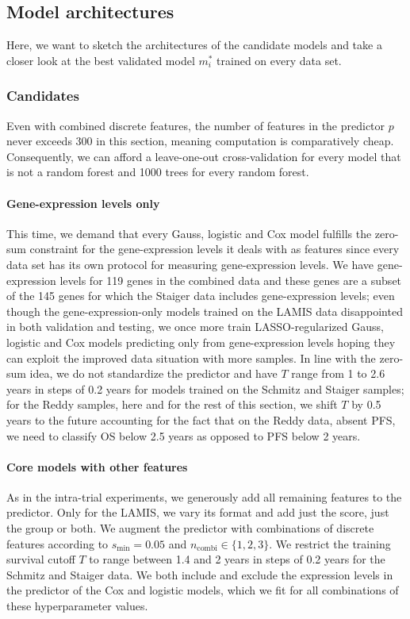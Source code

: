 \subsection{Model architectures}

Here, we want to sketch the architectures of the candidate models and take a closer look at the 
best validated model $m_i^*$ trained on every data set.

\subsubsection{Candidates}

Even with combined discrete features, the number of features in the predictor $p$ 
never exceeds \num{300} in this section, meaning computation is comparatively cheap. 
Consequently, we can afford 
a leave-one-out cross-validation for every model that is not a random forest and \num{1000} trees 
for every random forest.

\paragraph{Gene-expression levels only}
This time, we demand that every Gauss, logistic and Cox model fulfills the zero-sum constraint for 
the gene-expression levels it deals with as features since every data set has its own protocol for 
measuring gene-expression levels. We have gene-expression levels for \num{119} genes in the 
combined data and these genes are a subset of the \num{145} genes for which the Staiger data 
includes gene-expression levels; even though the gene-expression-only models trained on the LAMIS 
data disappointed in both validation and testing, we once more train LASSO-regularized Gauss, 
logistic and Cox models predicting only from gene-expression levels hoping they can exploit the 
improved data situation with more samples. In line with the zero-sum idea, we do not standardize 
the predictor and have $T$ range from \num{1} to \num{2.6} years in steps of \num{0.2} years for 
models trained on the Schmitz and Staiger samples; for the Reddy samples, here and for the rest 
of this section, we shift $T$ by
\num{0.5} years to the future accounting for the fact that on the Reddy data, absent PFS, we need 
to classify OS below \num{2.5} years as opposed to PFS below \num{2} years.

\paragraph{Core models with other features}
As in the intra-trial experiments, we generously add all remaining features to the predictor. Only 
for the LAMIS, we vary its format and add just the score, just the group or both. We augment the 
predictor with combinations of discrete features according to $s_\text{min} = \num{0.05}$ and 
$n_\text{combi} \in \{ 1, 2, 3 \}$. We restrict the training survival cutoff $T$ to range between 
\num{1.4} and \num{2} years in steps of \num{0.2} years for the Schmitz and Staiger data. We 
both include and exclude the expression levels in the predictor of the Cox and logistic 
models, which we fit for all combinations of these hyperparameter values.

